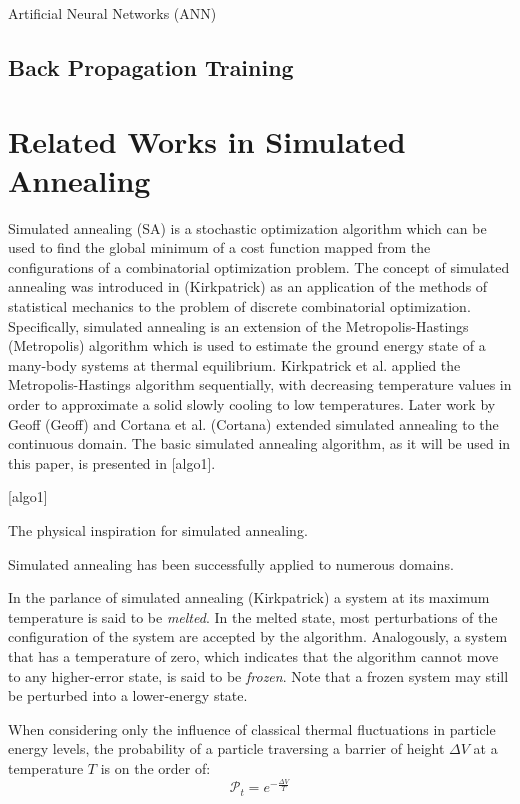 \documentclass[11pt]{afthesis}
\begin{document}
Artificial Neural Networks (ANN) 

\subsection{Back Propagation Training}


\section{Related Works in Simulated Annealing}

Simulated annealing (SA) is a stochastic optimization algorithm which can be used to find the global minimum of a cost function mapped from the configurations of a combinatorial optimization problem. The concept of simulated annealing was introduced in (Kirkpatrick) as an application of the methods of statistical mechanics to the problem of discrete combinatorial optimization. Specifically, simulated annealing is an extension of the Metropolis-Hastings (Metropolis) algorithm which is used to estimate the ground energy state of a many-body systems at thermal equilibrium. Kirkpatrick et al. applied the Metropolis-Hastings algorithm sequentially, with decreasing temperature values in order to approximate a solid slowly cooling to low temperatures. Later work by Geoff (Geoff) and Cortana et al. (Cortana) extended simulated annealing to the continuous domain. The basic simulated annealing algorithm, as it will be used in this paper, is presented in [algo1]. 

[algo1]

The physical inspiration for simulated annealing. 

Simulated annealing has been successfully applied to numerous domains.

In the parlance of simulated annealing (Kirkpatrick) a system at its maximum temperature is said to be \textit{melted}. In the melted state, most perturbations of the configuration of the system are accepted by the algorithm. Analogously, a system that has a temperature of zero, which indicates that the algorithm cannot move to any higher-error state, is said to be \textit{frozen}. Note that a frozen system may still be perturbed into a lower-energy state.

When considering only the influence of classical thermal fluctuations in particle energy levels, the probability of a particle traversing a barrier of height \begin{math} \Delta V \end{math} at a temperature \begin{math} T \end{math} is on the order of: \begin{equation} 
\mathcal{P}_t = e^{-\frac{\Delta V}{T}} 
\end{equation}
\end{document}
